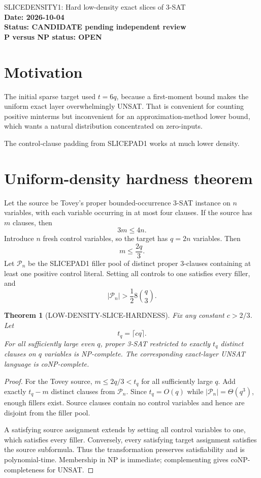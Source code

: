 \documentclass[11pt]{article}
\newtheorem{theorem}{Theorem}
\begin{document}
\begin{center}
{\Large SLICEDENSITY1: Hard low-density exact slices of 3-SAT}\\[4pt]
\textbf{Date: 2026-10-04}\\
\textbf{Status: CANDIDATE pending independent review}\\
\textbf{P versus NP status: OPEN}
\end{center}

\section{Motivation}

The initial sparse target used \(t=6q\), because a first-moment bound makes the uniform exact layer overwhelmingly UNSAT. That is convenient for counting positive minterms but inconvenient for an approximation-method lower bound, which wants a natural distribution concentrated on zero-inputs.

The control-clause padding from SLICEPAD1 works at much lower density.

\section{Uniform-density hardness theorem}

Let the source be Tovey's proper bounded-occurrence 3-SAT instance on \(n\) variables, with each variable occurring in at most four clauses. If the source has \(m\) clauses, then
\[
3m\le4n.
\]
Introduce \(n\) fresh control variables, so the target has \(q=2n\) variables. Then
\[
m\le\frac{2q}{3}.
\]
Let \(\mathcal P_n\) be the SLICEPAD1 filler pool of distinct proper 3-clauses containing at least one positive control literal. Setting all controls to one satisfies every filler, and
\[
|\mathcal P_n|>\frac12 8\binom q3.
\]

\begin{theorem}[LOW-DENSITY-SLICE-HARDNESS]
Fix any constant \(c>2/3\). Let
\[
t_q=\lceil cq\rceil.
\]
For all sufficiently large even \(q\), proper 3-SAT restricted to exactly \(t_q\) distinct clauses on \(q\) variables is NP-complete. The corresponding exact-layer UNSAT language is coNP-complete.
\end{theorem}

\begin{proof}
For the Tovey source, \(m\le2q/3<t_q\) for all sufficiently large \(q\). Add exactly \(t_q-m\) distinct clauses from \(\mathcal P_n\). Since \(t_q=O(q)\) while \(|\mathcal P_n|=\Theta(q^3)\), enough fillers exist. Source clauses contain no control variables and hence are disjoint from the filler pool.

A satisfying source assignment extends by setting all control variables to one, which satisfies every filler. Conversely, every satisfying target assignment satisfies the source subformula. Thus the transformation preserves satisfiability and is polynomial-time. Membership in NP is immediate; complementing gives coNP-completeness for UNSAT.
\end{proof}
\end{document}
